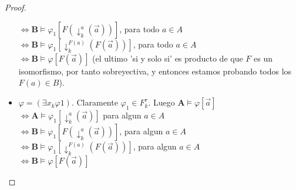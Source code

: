 \begin{proof}
\begin{itemize}
    $\iff \mathbf{B}\models\varphi_1[F(\downarrow_k^a(\vec{a}))]$, para todo $a \in A$\\
    $\iff \mathbf{B}\models\varphi_1[\downarrow_k^{F(a)}(F(\vec{a}))]$, para todo $a \in A$\\
    $\iff \mathbf{B}\models\varphi[F(\vec{a})]$ (el ultimo 'si y solo si' es producto de que $F$ es un isomorfismo, por tanto sobreyectiva, y entonces estamos probando todos los $F(a) \in B$).
    \item $\varphi = (\exists x_k \varphi1)$. Claramente $\varphi_1 \in F_k^\tau$. Luego $\mathbf{A}\models\varphi[\vec{a}]$\\
    $\iff \mathbf{A}\models\varphi_1[\downarrow_k^a(\vec{a})]$ para algun $a \in A$\\
    $\iff \mathbf{B}\models\varphi_1[F(\downarrow_k^a(\vec{a}))]$, para algun $a \in A$\\
    $\iff \mathbf{B}\models\varphi_1[\downarrow_k^{F(a)}(F(\vec{a}))]$, para algun $a \in A$\\
    $\iff \mathbf{B}\models\varphi[F(\vec{a})]$
  \end{itemize}

\end{proof} 

